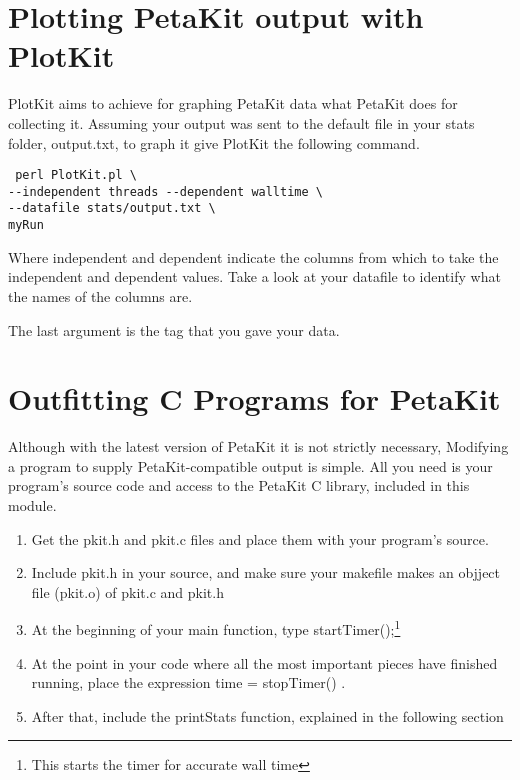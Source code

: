 \documentclass[12pt]{article}
\begin{document}
\section{Plotting PetaKit output with PlotKit}
PlotKit aims to achieve for graphing PetaKit data what PetaKit does for collecting it. Assuming your output was sent to the default file in your stats folder, output.txt, to graph it give PlotKit the following command.

\begin{verbatim} perl PlotKit.pl \
--independent threads --dependent walltime \
--datafile stats/output.txt \
myRun \end{verbatim}

Where independent and dependent indicate the columns from which to take the independent and dependent values. Take a look at your datafile to identify what the names of the columns are.

The last argument is the tag that you gave your data.

\section{Outfitting C Programs for PetaKit}
Although with the latest version of PetaKit it is not strictly necessary, Modifying a program to supply PetaKit-compatible output is simple. All you need is your program's source code and access to the PetaKit C library, included in this module.
\begin{enumerate}
   \item Get the pkit.h and pkit.c files and place them with your program's source.
   \item Include pkit.h in your source, and make sure your makefile makes an objject file (pkit.o) of pkit.c and pkit.h
   \item At the beginning of your main function, type startTimer();\footnote{This starts the timer for accurate wall time} 
   \item At the point in your code where all the most important pieces have finished running, place the expression time = stopTimer() .
   \item After that, include the printStats function, explained in the following section 
\end{enumerate}
\end{document}
